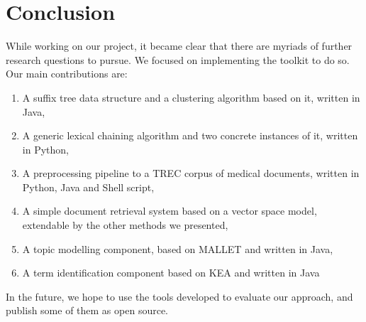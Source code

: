 \documentclass[11pt, a4paper, abstraction]{scrartcl}
\begin{document}
% 
% 
% 
% 
% 
% 

\section{Conclusion}
\label{sec:conclusion}

While working on our project, it became clear that there are myriads of further research questions to pursue. We focused on implementing the toolkit to do so. Our main contributions are:

\begin{enumerate}
  \item A suffix tree data structure and a clustering algorithm based on it, written in Java,
  \item A generic lexical chaining algorithm and two concrete instances of it, written in Python,
  \item A preprocessing pipeline to a TREC corpus of medical documents, written in Python, Java and Shell script,
  \item A simple document retrieval system based on a vector space model, extendable by the other methods we presented,
  \item A topic modelling component, based on MALLET and written in Java,
  \item A term identification component based on KEA and written in Java   
\end{enumerate} 

In the future, we hope to use the tools developed to evaluate our approach, and publish some of them as open source.
\end{document}
